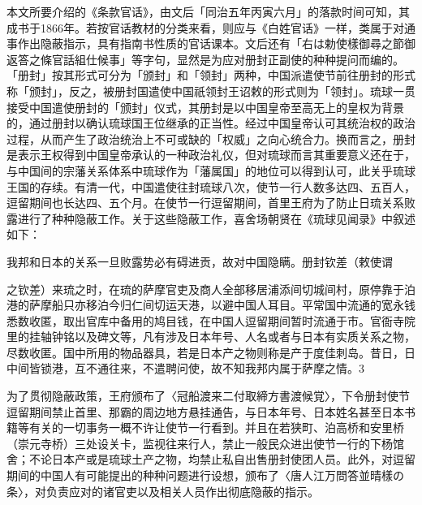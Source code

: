 本文所要介绍的《条款官话》，由文后「同治五年丙寅六月」的落款时间可知，其成书于1866年。若按官话教材的分类来看，则应与《白姓官话》一样，类属于对通事作出隐蔽指示，具有指南书性质的官话课本。文后还有「右は勅使樣御尋之節御返答之條官話組仕候事」等字句，显然是为应对册封正副使的种种提问而编的。「册封」按其形式可分为「颁封」和「领封」两种，中国派遣使节前往册封的形式称「颁封」，反之，被册封国遣使中国祇领封王诏敕的形式则为「领封」。琉球一贯接受中国遣使册封的「颁封」仪式，其册封是以中国皇帝至高无上的皇权为背景的，通过册封以确认琉球国王位继承的正当性。经过中国皇帝认可其统治权的政治过程，从而产生了政治统治上不可或缺的「权威」之向心统合力。换而言之，册封是表示王权得到中国皇帝承认的一种政治礼仪，但对琉球而言其重要意义还在于，与中国间的宗藩关系体系中琉球作为「藩属国」的地位可以得到认可，此关乎琉球王国的存续。有清一代，中国遣使往封琉球八次，使节一行人数多达四、五百人，逗留期间也长达四、五个月。在使节一行逗留期间，首里王府为了防止日琉关系败露进行了种种隐蔽工作。关于这些隐蔽工作，喜舍场朝贤在《琉球见闻录》中叙述如下：

\begin{BookQuote}
我邦和日本的关系一旦败露势必有碍进贡，故对中国隐瞒。册封钦差（敕使谓
\end{BookQuote}

\vfill
\begin{BookNotes}
\end{BookNotes}

\begin{BookQuote}
之钦差）来琉之时，在琉的萨摩官吏及商人全部移居浦添间切城间村，原停靠于泊港的萨摩船只亦移泊今归仁间切运天港，以避中国人耳目。平常国中流通的宽永钱悉数收匿，取出官库中备用的鸠目钱，在中国人逗留期间暂时流通于市。官衙寺院里的挂轴钟铭以及碑文等，凡有涉及日本年号、人名或者与日本有实质关系之物，尽数收匿。国中所用的物品器具，若是日本产之物则称是产于度佳刺岛。昔日，日中间皆锁港，互不通往来，不遣聘问使，故不知我邦内属于萨摩之情。3
\end{BookQuote}

为了贯彻隐蔽政策，王府颁布了〈冠船渡来二付取締方書渡候覚〉，下令册封使节逗留期间禁止首里、那霸的周边地方悬挂通告，与日本年号、日本姓名甚至日本书籍等有关的一切事务一概不许让使节一行看到。并且在若狭町、泊高桥和安里桥（崇元寺桥）三处设关卡，监视往来行人，禁止一般民众进出使节一行的下杨馆舍；不论日本产或是琉球土产之物，均禁止私自出售册封使团人员。此外，对逗留期间的中国人有可能提出的种种问题进行设想，颁布了〈唐人江万問答並晴樣の条〉，对负责应对的诸官吏以及相关人员作出彻底隐蔽的指示。

